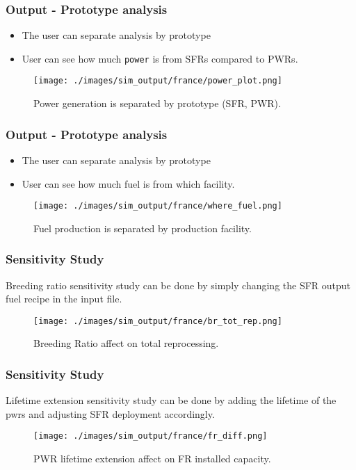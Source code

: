 \begin{frame}
    \frametitle{Output - Prototype analysis}
    \begin{itemize}
        \item The user can separate analysis by prototype
        \item User can see how much \texttt{power} is from SFRs compared to PWRs.
    \end{itemize}
    \begin{figure}[htbp!]
        \begin{center}
                \texttt{[image: ./images/sim\_output/france/power\_plot.png]}
        \end{center}
    \caption{Power generation is separated by prototype (SFR, PWR).}
    \end{figure}
\end{frame}


\begin{frame}
    \frametitle{Output - Prototype analysis}
    \begin{itemize}
        \item The user can separate analysis by prototype
        \item User can see how much fuel is from which facility.
    \end{itemize}
    \begin{figure}[htbp!]
        \begin{center}
                \texttt{[image: ./images/sim\_output/france/where\_fuel.png]}
        \end{center}
    \caption{Fuel production is separated by production facility.}
    \end{figure}
\end{frame}

\begin{frame}
    \frametitle{Sensitivity Study}
    Breeding ratio sensitivity study can be done by simply changing the 
    SFR output fuel recipe in the input file.
    \begin{figure}[htbp!]
        \begin{center}
                \texttt{[image: ./images/sim\_output/france/br\_tot\_rep.png]}
        \end{center}
    \caption{Breeding Ratio affect on total reprocessing.}
    \end{figure}
\end{frame}

\begin{frame}
    \frametitle{Sensitivity Study}
    Lifetime extension sensitivity study can be done by adding the
    lifetime of the pwrs and adjusting SFR deployment accordingly.
    \begin{figure}[htbp!]
        \begin{center}
                \texttt{[image: ./images/sim\_output/france/fr\_diff.png]}
        \end{center}
    \caption{PWR lifetime extension affect on FR installed capacity.}
    \end{figure}
\end{frame}




